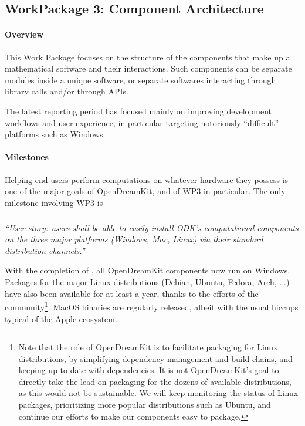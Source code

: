 \subsection{WorkPackage 3:  Component Architecture}

\paragraph{Overview}

This Work Package focuses on the structure of the components that make
up a mathematical software and their interactions. Such components can
be separate modules inside a unique software, or separate softwares
interacting through library calls and/or through APIs.

The latest reporting period has focused mainly on improving
development workflows and user experience, in particular targeting
notoriously ``difficult'' platforms such as Windows.

\paragraph{Milestones} Helping end users perform computations on
whatever hardware they possess is one of the major goals of
OpenDreamKit, and of WP3 in particular. The only milestone involving
WP3 is

\subparagraph{}

\emph{“User story: users shall be able to easily install ODK's
    computational components on the three major platforms (Windows,
    Mac, Linux) via their standard distribution channels.”}

  With the completion of
  , all
  OpenDreamKit components now run on Windows. Packages for the major
  Linux distributions (Debian, Ubuntu, Fedora, Arch, ...) have also
  been available for at least a year, thanks to the efforts of the
  community\footnote{Note that the role of OpenDreamKit is to
    facilitate packaging for Linux distributions, by simplifying
    dependency management and build chains, and keeping up to date
    with dependencies. It is not OpenDreamKit's goal to directly take
    the lead on packaging for the dozens of available distributions,
    as this would not be sustainable. We will keep monitoring the
    status of Linux packages, prioritizing more popular distributions
    such as Ubuntu, and continue our efforts to make our components
    easy to package.}. MacOS binaries are regularly released, albeit
  with the usual hiccups typical of the Apple ecosystem.

